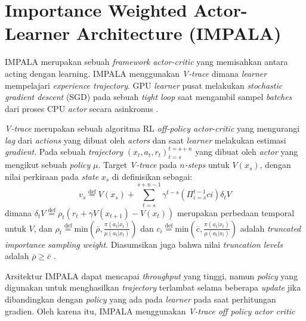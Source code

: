 \section{Importance Weighted Actor-Learner Architecture (IMPALA)}

IMPALA merupakan sebuah \emph{framework} \emph{actor-critic} yang memisahkan antara acting dengan learning.
IMPALA menggunakan \emph{V-trace} dimana \emph{learner} mempelajari \emph{experience trajectory}.
GPU \emph{learner} pusat melakukan \emph{stochastic gradient descent} (SGD) pada sebuah \emph{tight loop} saat mengambil sampel 
\emph{batches} dari proses CPU \emph{actor} secara asinkronus \citep{impala}.

\emph{V-trace} merupakan sebuah algoritma RL \emph{off-policy actor-critic} yang mengurangi \emph{lag} dari \emph{actions} yang dibuat oleh \emph{actors}
dan saat \emph{learner} melakukan estimasi \emph{gradient}. 
Pada sebuah \emph{trajectory} $(x_{t}, a_{t}, r_{t})^{t=s+n}_{t=s}$ yang dibuat oleh \emph{actor} yang mengikut sebuah \emph{policy} $\mu$.
Target \emph{V-trace} pada \emph{$n$-steps} untuk $V(x_{s})$, dengan nilai perkiraan pada \emph{state} $x_{s}$ di definisikan sebagai:
\begin{equation}
  v_{s} \stackrel{\text{def}}{=} V(x_{s}) + \sum^{s+n-1}_{t=s} \gamma^{t-s} \left(\Pi^{t-1}_{i=s}ci\right) \delta_{t}V
\end{equation}
dimana $\delta_{t}V \stackrel{\text{def}}{=} \rho_{t}\left(r_{t} + \gamma V(x_{t+1}) - V(x_{t})\right)$ merupakan perbedaan temporal untuk $V$,
dan $\rho_{t} \stackrel{\text{def}}{=} \text{min}\left(\overline{\rho}, \frac{\pi (a_{t}|x_{t})}{\mu (a_{t}|x_{t})}\right)$ dan 
$c_{i} \stackrel{\text{def}}{=} \text{min}\left(\overline{c}, \frac{\pi (a_{t}|x_{t})}{\mu (a_{t}|x_{t})}\right)$ adalah \emph{truncated importance sampling weight}.
Diasumsikan juga bahwa nilai \emph{truncation levels} adalah $\overline{\rho} \geq \overline{c}$ \citep{impala}.

Arsitektur IMPALA dapat mencapai \emph{throughput} yang tinggi, namun \emph{policy} yang digunakan untuk menghasilkan \emph{trajectory} terlambat selama beberapa \emph{update} jika dibandingkan dengan \emph{policy} yang ada pada \emph{learner} pada saat perhitungan gradien.
Oleh karena itu, IMPALA menggunakan \emph{V-trace off policy actor critic}

